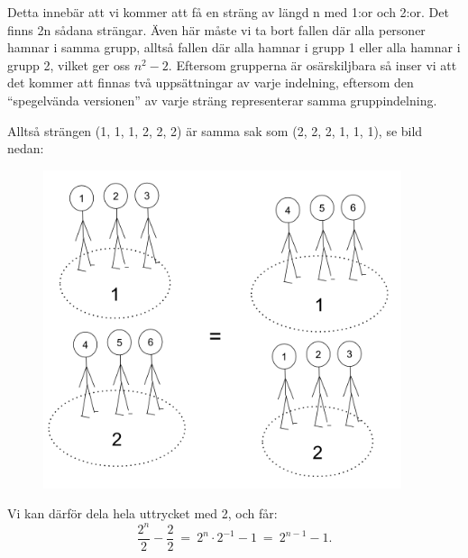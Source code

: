 \documentclass[nobib]{tufte-handout}
\begin{document}
\begin{xca2}
Detta innebär att vi kommer att få en sträng av längd n med 1:or och 2:or. Det finns 2n sådana strängar. Även här måste vi ta bort fallen där alla personer hamnar i samma grupp, alltså fallen där alla hamnar i grupp 1 eller alla hamnar i grupp 2, vilket ger oss  $n^{2} - 2$. Eftersom grupperna är osärskiljbara så inser vi att det kommer att finnas två uppsättningar av varje indelning, eftersom den “spegelvända versionen” av varje sträng representerar samma gruppindelning. 

Alltså strängen (1, 1, 1, 2, 2, 2) är samma sak som (2, 2, 2, 1, 1, 1), se bild nedan:

\begin{figure}[h]
\includegraphics[width=105mm]{ovning_2b.4.png}
\end{figure}

Vi kan därför dela hela uttrycket med 2, och får:
$$\frac{2^{n}}{2}- \frac{2}{2}\:= \: 2^{n}\cdot 2^{-1} - 1\:=\:2^{n-1} - 1.$$
\end{xca2}
\end{document}

